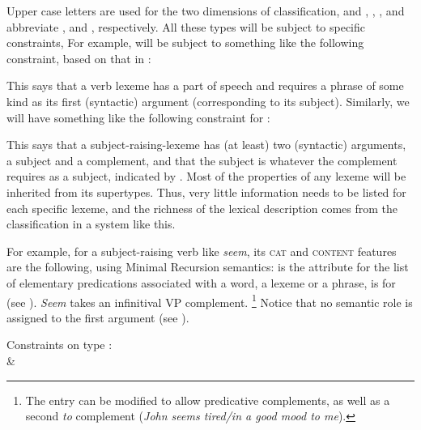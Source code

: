 \documentclass[output=paper
	        ,collection
	        ,collectionchapter
 	        ,biblatex
                ,babelshorthands
                ,newtxmath
                ,draftmode
                ,colorlinks, citecolor=brown
]{langscibook}
\begin{document}
Upper case letters are used for the two dimensions of classification, and , , , and  abbreviate , and , respectively. All these types will be subject to specific constraints, For example,  will be subject to something like the following constraint, based on that in \citet[22]{GSag2000a-u}:

\ea\label{ex:prop21}
 \impl
{}
\z

This says that a verb lexeme has a  part of speech and requires a phrase of some kind as its first (syntactic) argument (corresponding to its subject). Similarly, we will have something like the following constraint for :

\ea\label{ex:prop22}
 \impl
{}
\z

This says that a subject-raising-lexeme has (at least) two (syntactic) arguments, a subject and a complement, and that the subject is whatever the complement requires as a subject, indicated by . Most of the properties of any lexeme will be inherited from its supertypes. Thus, very little information needs to be listed for each specific lexeme, and the richness of the lexical description comes from the classification in a system like this.

For example, for a subject-raising verb like \emph{seem}, its \textsc{cat} and \textsc{content}
features are the following, using Minimal Recursion semantics\indexmrs:  is the
attribute for the list of elementary predications associated with a word, a lexeme or a phrase,
 is for  (see ). \emph{Seem} takes an infinitival VP complement.%
%
\footnote{The entry can be modified to allow predicative complements, as well as a second \emph{to} complement (\emph{John seems tired/in a good mood to me}).}
%
Notice that no semantic role is assigned to the first argument (see ).

\ea\label{ex:prop23}
Constraints on type :\\
 \impl {} \&\\
\z
\end{document}
